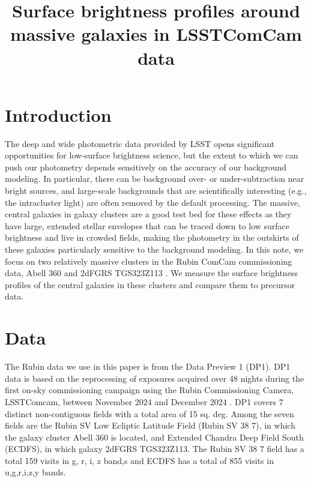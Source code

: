 \documentclass[SE,lsstdraft,authoryear,toc]{lsstdoc}
\title{Surface brightness profiles around massive galaxies in LSSTComCam data}
\date{\vcsDate}
\begin{document}
\maketitle


\section{Introduction}
The deep and wide photometric data provided by LSST opens significant opportunities for low-surface brightness science, but the extent to which we can push our photometry depends sensitively on the accuracy of our background modeling. In particular, there can be background over- or under-subtraction near bright sources, and large-scale backgrounds that are scientifically interesting (e.g., the intracluster light) are often removed by the default processing. The massive, central galaxies in galaxy clusters are a good test bed for these effects as they have large, extended stellar envelopes that can be traced down to low surface brightness and live in crowded fields, making the photometry in the outskirts of these galaxies particularly sensitive to the background modeling.
In this note, we focus on two relatively massive clusters in the Rubin ComCam commissioning data, Abell 360 and 2dFGRS TGS323Z113 . We measure the surface brightness profiles of the central galaxies in these clusters and compare them to precursor data.

\section{Data}
The Rubin data we use in this paper is from the Data Preview 1 (DP1). DP1 data is based on the reprocessing of exposures acquired over 48 nights during the first on-sky commissioning campaign using the Rubin Commissioning Camera, LSSTComcam, between November 2024 and December 2024 \citep{10.71929/RUBIN/2561361}. DP1 covers 7 distinct non-contiguous fields with a total area of 15 sq. deg. Among the seven fields are the Rubin SV Low Ecliptic Latitude Field (Rubin SV 38 7), in which the galaxy cluster Abell 360 is located, and Extended Chandra Deep Field South (ECDFS), in which galaxy 2dFGRS TGS323Z113. The Rubin SV 38 7 field has a total 159 visits in g, r, i, z band,s and ECDFS has a total of 855 visits in u,g,r,i,z,y bands.
\end{document}

